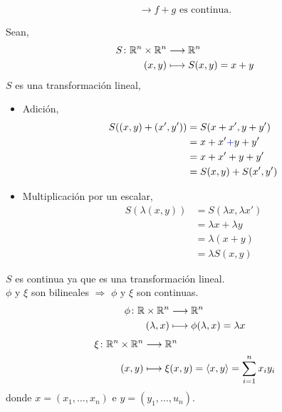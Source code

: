 {\begin{description}
		      $$
			      \rightarrow f+g \text{ es continua.}
		      $$
		\item[(ii), (iii), (iv)]
		      Sean,
		      \begin{align*}
			      S \colon \mathbb{R}^{n} \times \mathbb{R}^{n} & \longrightarrow\mathbb{R}^{n}      \\
			      (x,y)                   & \longmapsto S(x,y)= x+y
		      \end{align*}
		      $S$ es una transformación lineal,
		      \begin{itemize}
			      \item Adición, \begin{align*}
				            S((x,y)+(x',y')) & =S(x+x', y+y')               \\
				                             & =x+x' {\color{blue} + } y+y' \\
				                             & =x+x'+ y+y'                  \\
				                             & =S(x,y)+S(x',y')
			            \end{align*}
			      \item Multiplicación por un escalar, \begin{align*}
				            S(\lambda(x,y) ) & =S(\lambda x,\lambda x') \\
				                             & =\lambda x+ \lambda y    \\
				                             & =\lambda (x+y)           \\
				                             & =\lambda S(x,y)
			            \end{align*}
		      \end{itemize}
		      $S$ es continua ya que es una transformación lineal.\\
		      $\phi $ y $\xi$ son bilineales $\Rightarrow$ $\phi$ y $\xi$ son continuas.
		      \begin{align*}
			      \phi \colon \mathbb{R}  \times \mathbb{R}^{n} & \longrightarrow\mathbb{R}^{n}                     \\
			      (\lambda,x)                & \longmapsto \phi(\lambda,x)= \lambda x
		      \end{align*}
		      \begin{align*}
			      \xi \colon \mathbb{R}^{n}  \times \mathbb{R}^{n} & \longrightarrow\mathbb{R}^{n}                                            \\
			      (x,y)                      & \longmapsto \xi(x,y)= \langle x, y \rangle = \sum_{i = 1}^{n} x_i y_i
		      \end{align*}
		      donde $x=(x_1, \ldots, x_n)$ e $y=(y_1, \ldots, u_n)$.


\end{description}}
